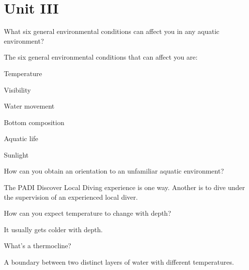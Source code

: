 	\chapter*{Unit III}
	\setcounter{questionnumber}{0}

	\begin{qanda}
		\begin{question}
What six general environmental conditions can affect you in any aquatic environment?
		\end{question}

		\begin{answer}
The six general environmental conditions that can affect you are:
			\begin{nospacenumberedlist}
				\item Temperature
				\item Visibility
				\item Water movement
				\item Bottom composition
				\item Aquatic life
				\item Sunlight
			\end{nospacenumberedlist}
		\end{answer}
	\end{qanda}

	\begin{qanda}
		\begin{question}
How can you obtain an orientation to an unfamiliar aquatic environment?
		\end{question}

		\begin{answer}
The PADI Discover Local Diving experience is one way.  Another is to dive under the supervision of an experienced local diver.
		\end{answer}
	\end{qanda}

	\begin{qanda}
		\begin{question}
How can you expect temperature to change with depth?
		\end{question}

		\begin{answer}
It usually gets colder with depth.
		\end{answer}
	\end{qanda}

	\begin{qanda}
		\begin{question}
What's a thermocline?
		\end{question}

		\begin{answer}
A boundary between two distinct layers of water with different temperatures.
		\end{answer}
	\end{qanda}

